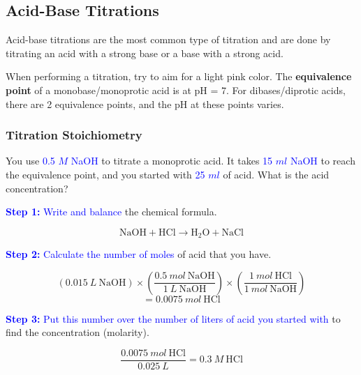 \documentclass[a4paper, 12pt]{article}
\begin{document}
\subsection*{Acid-Base Titrations}
Acid-base titrations are the most common type of titration and are done by titrating an acid with a strong base or a base with a strong acid.

\begin{center}
\end{center}

When performing a titration, try to aim for a light pink color. The \textbf{equivalence point} of a monobase/monoprotic acid is at pH = 7. For dibases/diprotic acids, there are 2 equivalence points, and the pH at these points varies.

\subsubsection*{Titration Stoichiometry}
You use \textcolor{blue}{0.5 $M$ NaOH} to titrate a monoprotic acid. It takes \textcolor{blue}{15 $ml$ NaOH} to reach the equivalence point, and you started with \textcolor{blue}{25 $ml$} of acid. What is the acid concentration?

\textcolor{blue}{\textbf{Step 1:} Write and balance} the chemical formula.

$$\text{NaOH} + \text{HCl} \longrightarrow \text{H$_2$O} + \text{NaCl}$$

\textcolor{blue}{\textbf{Step 2:} Calculate the number of moles} of acid that you have.

$$(0.015 \: L \: \text{NaOH}) \times \left(\frac{0.5 \: mol \: \text{NaOH}}{1 \: L \: \text{NaOH}}\right) \times \left(\frac{1 \: mol \: \text{HCl}}{1 \: mol \: \text{NaOH}}\right) $$
$$=0.0075 \: mol \: \text{HCl}$$

\textcolor{blue}{\textbf{Step 3:} Put this number over the number of liters of acid you started with} to find the concentration (molarity).

$$\frac{0.0075 \: mol \: \text{HCl}}{0.025 \: L} = \boxed{0.3 \: M \: \text{HCl}}$$
\end{document}
